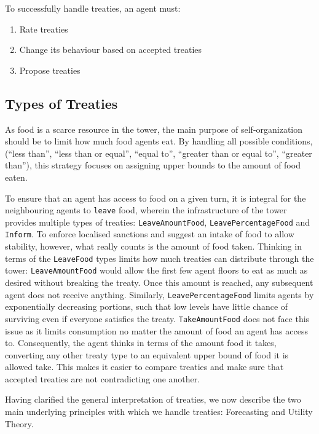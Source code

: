 To successfully handle treaties, an agent must:
\begin{enumerate}
    \item Rate treaties
    \item Change its behaviour based on accepted treaties
    \item Propose treaties
\end{enumerate}


\subsection{Types of Treaties}

As food is a scarce resource in the tower, the main purpose of self-organization should be to limit how much food agents eat. By handling all possible conditions, (``less than'', ``less than or equal'', ``equal to'', ``greater than or equal to'', ``greater than''), this strategy focuses on assigning upper bounds to the amount of food eaten.

To ensure that an agent has access to food on a given turn, it is integral for the neighbouring agents to \texttt{leave} food, wherein the infrastructure of the tower provides multiple types of treaties: \texttt{LeaveAmountFood}, \texttt{LeavePercentageFood} and \texttt{Inform}. To enforce localised sanctions and suggest an intake of food to allow stability, however, what really counts is the amount of food taken. Thinking in terms of the \texttt{LeaveFood} types limits how much treaties can distribute through the tower: \texttt{LeaveAmountFood} would allow the first few agent floors to eat as much as desired without breaking the treaty. Once this amount is reached, any subsequent agent does not receive anything. Similarly, \texttt{LeavePercentageFood} limits agents by exponentially decreasing portions, such that low levels have little chance of surviving even if everyone satisfies the treaty. \texttt{TakeAmountFood} does not face this issue as it limits consumption no matter the amount of food an agent has access to. Consequently, the agent thinks in terms of the amount food it takes, converting any other treaty type to an equivalent upper bound of food it is allowed take. This makes it easier to compare treaties and make sure that accepted treaties are not contradicting one another.

Having clarified the general interpretation of treaties, we now describe the two main underlying principles with which we handle treaties: Forecasting and Utility Theory.

